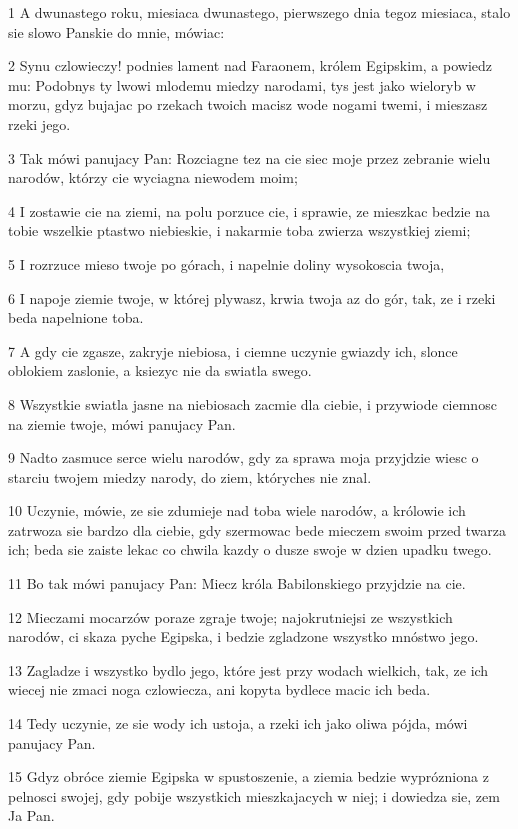 \par 1 A dwunastego roku, miesiaca dwunastego, pierwszego dnia tegoz miesiaca, stalo sie slowo Panskie do mnie, mówiac:
\par 2 Synu czlowieczy! podnies lament nad Faraonem, królem Egipskim, a powiedz mu: Podobnys ty lwowi mlodemu miedzy narodami, tys jest jako wieloryb w morzu, gdyz bujajac po rzekach twoich macisz wode nogami twemi, i mieszasz rzeki jego.
\par 3 Tak mówi panujacy Pan: Rozciagne tez na cie siec moje przez zebranie wielu narodów, którzy cie wyciagna niewodem moim;
\par 4 I zostawie cie na ziemi, na polu porzuce cie, i sprawie, ze mieszkac bedzie na tobie wszelkie ptastwo niebieskie, i nakarmie toba zwierza wszystkiej ziemi;
\par 5 I rozrzuce mieso twoje po górach, i napelnie doliny wysokoscia twoja,
\par 6 I napoje ziemie twoje, w której plywasz, krwia twoja az do gór, tak, ze i rzeki beda napelnione toba.
\par 7 A gdy cie zgasze, zakryje niebiosa, i ciemne uczynie gwiazdy ich, slonce oblokiem zaslonie, a ksiezyc nie da swiatla swego.
\par 8 Wszystkie swiatla jasne na niebiosach zacmie dla ciebie, i przywiode ciemnosc na ziemie twoje, mówi panujacy Pan.
\par 9 Nadto zasmuce serce wielu narodów, gdy za sprawa moja przyjdzie wiesc o starciu twojem miedzy narody, do ziem, któryches nie znal.
\par 10 Uczynie, mówie, ze sie zdumieje nad toba wiele narodów, a królowie ich zatrwoza sie bardzo dla ciebie, gdy szermowac bede mieczem swoim przed twarza ich; beda sie zaiste lekac co chwila kazdy o dusze swoje w dzien upadku twego.
\par 11 Bo tak mówi panujacy Pan: Miecz króla Babilonskiego przyjdzie na cie.
\par 12 Mieczami mocarzów poraze zgraje twoje; najokrutniejsi ze wszystkich narodów, ci skaza pyche Egipska, i bedzie zgladzone wszystko mnóstwo jego.
\par 13 Zagladze i wszystko bydlo jego, które jest przy wodach wielkich, tak, ze ich wiecej nie zmaci noga czlowiecza, ani kopyta bydlece macic ich beda.
\par 14 Tedy uczynie, ze sie wody ich ustoja, a rzeki ich jako oliwa pójda, mówi panujacy Pan.
\par 15 Gdyz obróce ziemie Egipska w spustoszenie, a ziemia bedzie wyprózniona z pelnosci swojej, gdy pobije wszystkich mieszkajacych w niej; i dowiedza sie, zem Ja Pan.

